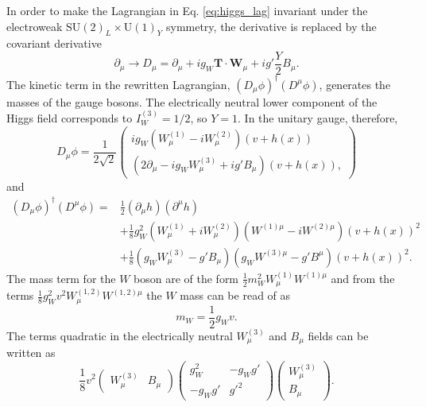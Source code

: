 In order to make the Lagrangian in Eq. \ref{eq:higgs_lag} invariant under the electroweak
$\text{SU}(2)_L \times \text{U}(1)_Y$ symmetry, the derivative is replaced by the covariant
derivative \cite{Thomson:2013zua}
\begin{equation}
\partial_\mu \rightarrow D_\mu = \partial_\mu + i g_W \mathbf{T} \cdot \mathbf{W}_\mu
+ i g' \frac{Y}{2} B_\mu.
\end{equation}
The kinetic term in the rewritten Lagrangian, $(D_\mu \phi)^\dag (D^\mu \phi)$, generates the
masses of the gauge bosons. The electrically neutral lower component of the Higgs field
corresponds to $I_W^{(3)} = 1/2$, so $Y=1$. In the unitary gauge, therefore,
\begin{equation}
D_\mu \phi = \frac{1}{2\sqrt{2}}
\begin{pmatrix}
i g_W (W_\mu^{(1)} - i W_\mu^{(2)})(v+h(x)) \\
(2 \partial_\mu - ig_W W_\mu^{(3)} + ig'B_\mu) (v+h(x)),
\end{pmatrix}
\end{equation}
and
\begin{equation}
\begin{aligned}
(D_\mu \phi)^\dag (D^\mu \phi) =
& \frac{1}{2} (\partial_\mu h)(\partial^\mu h) \\ 
&+ \frac{1}{8} g_W^2 (W_\mu^{(1)} + iW_\mu^{(2)}) (W^{(1)\mu} - iW^{(2)\mu}) (v+h(x))^2 \\
&+ \frac{1}{8} (g_W W_\mu^{(3)} - g'B_\mu)(g_W W^{(3)\mu} - g'B^\mu) (v+h(x))^2.
\end{aligned}
\label{eq:kinetic}
\end{equation}
The mass term for the $W$ boson are of the form $\frac{1}{2}m_W^2 W_\mu^{(1)}W^{(1)\mu}$
and from the terms $\frac{1}{8} g_W^2 v^2 W_\mu^{(1, 2)}W^{(1, 2)\mu}$ the $W$ mass can be
read of as
\begin{equation}
m_W = \frac{1}{2} g_W v.
\end{equation}
The terms quadratic in the electrically neutral $W_\mu^{(3)}$ and $B_\mu$ fields can be
written as
\begin{equation}
\frac{1}{8} v^2
\begin{pmatrix}
W_\mu^{(3)} & B_\mu
\end{pmatrix}
\begin{pmatrix}
g_W^2    & - g_W g' \\
- g_W g' & g'^2
\end{pmatrix}
\begin{pmatrix}
W_\mu^{(3)} \\
B_\mu
\end{pmatrix}.
\end{equation}
